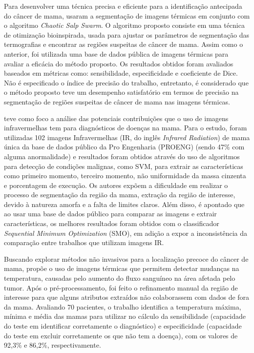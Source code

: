 Para desenvolver uma técnica precisa e eficiente para a identificação antecipada do câncer de mama,  usaram a segmentação de imagens térmicas em conjunto com o algoritmo \textit{Chaotic Salp Swarm}. O algoritmo proposto consiste em uma técnica de otimização bioinspirada, usada para ajustar os parâmetros de segmentação das termografias e encontrar as regiões suspeitas de câncer de mama. Assim como o anterior, foi utilizada uma base de dados pública de imagens térmicas para avaliar a eficácia do método proposto. Os resultados obtidos foram avaliados baseados em métricas como: sensibilidade, especificidade e coeficiente de Dice. Não é especificado o índice de precisão do trabalho, entretanto, é considerado que o método proposto teve um desempenho satisfatório em termos de precisão na segmentação de regiões suspeitas de câncer de mama nas imagens térmicas.

 teve como foco a análise das potenciais contribuições que o uso de imagens infravermelhas tem para diagnósticos de doenças na mama. Para o estudo, foram utilizadas 102 imagens Infravermelhas (IR, do inglês \textit{Infrared Radiation}) de mama única da base de dados público da Pro Engenharia (PROENG) (sendo 47\% com alguma anormalidade) e resultados foram obtidos através do uso de algoritmos para detecção de condições malignas, como SVM, para extrair as características como primeiro momento, terceiro momento, não uniformidade da massa cinzenta e porcentagem de execução. Os autores expõem a dificuldade em realizar o processo de segmentação da região da mama, extração da região de interesse, devido à natureza amorfa e a falta de limites claros. Além disso, é apontado que ao usar uma base de dados público para comparar as imagens e extrair características, os melhores resultados foram obtidos com o classificador \textit{Sequential Minimum Optimization} (SMO), em adição a expor a inconsistência da comparação entre trabalhos que utilizam imagens IR. 

Buscando explorar métodos não invasivos para a localização precoce do câncer de mama,  propõe o uso de imagens térmicas que permitem detectar mudanças na temperatura, causadas pelo aumento do fluxo sanguíneo na área afetada pelo tumor. Após o pré-processamento, foi feito o refinamento manual da região de interesse para que alguns atributos extraídos não colaborassem com dados de fora da mama. Avaliando 70 pacientes, o trabalho identifica a temperatura máxima, mínima e média das mamas para utilizar no cálculo da sensibilidade (capacidade do teste em identificar corretamente o diagnóstico) e especificidade (capacidade do teste em excluir corretamente os que não tem a doença), com os valores de 92,3\% e 86,2\%, respectivamente.

